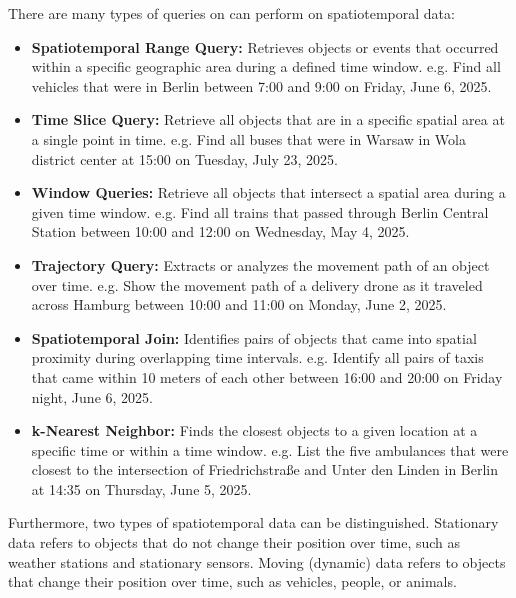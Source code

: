 There are many types of queries on can perform on spatiotemporal data:
\begin{itemize}
	\item \textbf{Spatiotemporal Range Query:} Retrieves objects or events that occurred within a specific geographic area during a defined time window.
		e.g. Find all vehicles that were in Berlin between 7:00 and 9:00 on Friday, June 6, 2025.

	\item \textbf{Time Slice Query:} Retrieve all objects that are in a specific spatial area at a single point in time.
		e.g. Find all buses that were in Warsaw in Wola district center at 15:00 on Tuesday, July 23, 2025.

	\item \textbf{Window Queries:} Retrieve all objects that intersect a spatial area during a given time window.
		e.g. Find all trains that passed through Berlin Central Station between 10:00 and 12:00 on Wednesday, May 4, 2025. 

	\item \textbf{Trajectory Query:} Extracts or analyzes the movement path of an object over time.
		e.g. Show the movement path of a delivery drone as it traveled across Hamburg between 10:00 and 11:00 on Monday, June 2, 2025.

	\item \textbf{Spatiotemporal Join:} Identifies pairs of objects that came into spatial proximity during overlapping time intervals.
		e.g. Identify all pairs of taxis that came within 10 meters of each other between 16:00 and 20:00 on Friday night, June 6, 2025. 

	\item \textbf{k-Nearest Neighbor:} Finds the closest objects to a given location at a specific time or within a time window.
		e.g. List the five ambulances that were closest to the intersection of Friedrichstraße and Unter den Linden in Berlin at 14:35 on Thursday, June 5, 2025.
\end{itemize}

Furthermore, two types of spatiotemporal data can be distinguished.
Stationary data refers to objects that do not change their position over time, such as weather stations and stationary sensors.
Moving (dynamic) data refers to objects that change their position over time, such as vehicles, people, or animals.

%
%

